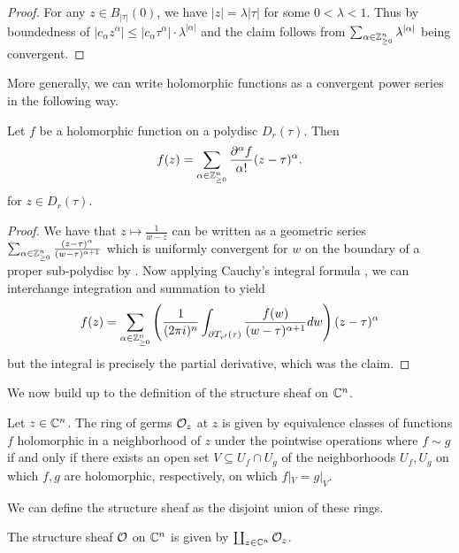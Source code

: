 \begin{proof}
    For any $z\in B_{|\tau|}(0)$, we have $|z|=\lambda|\tau|$ for some $0<\lambda<1$. Thus by boundedness of $|c_{\alpha}z^{\alpha}|\leq|c_{\alpha}\tau^{\alpha}|\cdot\lambda^{|\alpha|}$ and the claim follows from $\sum_{\alpha\in\mathbb{Z}_{\geq0}^{n}}\lambda^{|\alpha|}$ being convergent. 
\end{proof}
More generally, we can write holomorphic functions as a convergent power series in the following way. 
\begin{theorem}\label{thm: power series expansion of holomorphic functions}
    Let $f$ be a holomorphic function on a polydisc $D_{r}(\tau)$. Then 
    $$f(z)=\sum_{\alpha\in\mathbb{Z}_{\geq0}^{n}}\frac{\partial^{\alpha}f}{\alpha!}(z-\tau)^{\alpha}.$$
    for $z\in D_{r}(\tau)$.
\end{theorem}
\begin{proof}
    We have that $z\mapsto\frac{1}{w - z}$ can be written as a geometric series $\sum_{\alpha\in\mathbb{Z}_{\geq0}^{n}}\frac{(z-\tau)^{\alpha}}{(w-\tau)^{\alpha+1}}$ which is uniformly convergent for $w$ on the boundary of a proper sub-polydisc by . Now applying Cauchy's integral formula , we can interchange integration and summation to yield 
    $$f(z)=\sum_{\alpha\in\mathbb{Z}_{\geq0}^{n}}\left(\frac{1}{(2\pi i)^{n}}\int_{\partial T_{r'}(\tau)}\frac{f(w)}{(w-\tau)^{\alpha+1}}dw\right)(z-\tau)^{\alpha}$$ 
    but the integral is precisely the partial derivative, which was the claim. 
\end{proof}
We now build up to the definition of the structure sheaf on $\mathbb{C}^{n}$. 
\begin{definition}\label{def: germ}
    Let $z\in\mathbb{C}^{n}$. The ring of germs $\mathcal{O}_{z}$ at $z$ is given by equivalence classes of functions $f$ holomorphic in a neighborhood of $z$ under the pointwise operations where $f\sim g$ if and only if there exists an open set $V\subseteq U_{f}\cap U_{g}$ of the neighborhoods $U_{f},U_{g}$ on which $f,g$ are holomorphic, respectively, on which $f|_{V}=g|_{V}$.
\end{definition}
We can define the structure sheaf as the disjoint union of these rings. 
\begin{definition}\label{def: structure sheaf}
    The structure sheaf $\mathcal{O}$ on $\mathbb{C}^{n}$ is given by $\coprod_{z\in\mathbb{C}^{n}}\mathcal{O}_{z}$. 
\end{definition}

